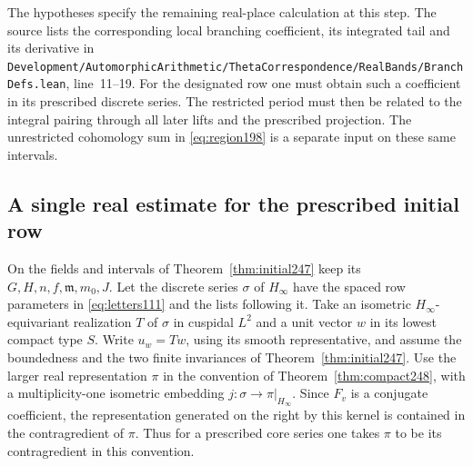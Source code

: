 \documentclass[a4paper,11pt]{article}
\theoremstyle{definition}
\theoremstyle{remark}
\newcommand{\srcloc}[2]{{\small\nolinkurl{#1.lean}}, line~#2}
\numberwithin{equation}{section}
\begin{document}
The hypotheses specify the remaining real-place calculation at this
step. The source lists the corresponding local branching coefficient,
its integrated tail and its derivative in
\srcloc{Development/AutomorphicArithmetic/ThetaCorrespondence/RealBands/BranchDefs}{11--19}.
For the designated row one must obtain such a coefficient in its
prescribed discrete series. The restricted period must then be
related to the integral pairing through all later lifts and the
prescribed projection. The unrestricted cohomology sum in
\eqref{eq:region198} is a separate input on these same intervals.

\subsection{A single real estimate for the prescribed initial row}\label{nav:I-54}
On the fields and intervals of Theorem~\ref{thm:initial247} keep its
\(G,H,n,f,\mathfrak m,m_0,J\). Let the discrete series \(\sigma\)
of \(H_\infty\) have the spaced row parameters in
\eqref{eq:letters111} and the lists following it. Take an isometric
\(H_\infty\)-equivariant realization \(T\) of \(\sigma\) in cuspidal
\(L^2\) and a unit vector \(w\) in its lowest compact type \(S\).
Write \(u_w=T w\), using its smooth representative, and assume the
boundedness and the two finite invariances of Theorem~\ref{thm:initial247}.
Use the larger real representation \(\pi\) in the convention of
Theorem~\ref{thm:compact248}, with a multiplicity-one isometric
embedding \(j:\sigma\to\pi|_{H_\infty}\). Since \(F_v\) is a
conjugate coefficient, the representation generated on the right
by this kernel is contained in the contragredient of \(\pi\).
Thus for a prescribed core series one takes \(\pi\) to be its
contragredient in this convention.
\end{document}
